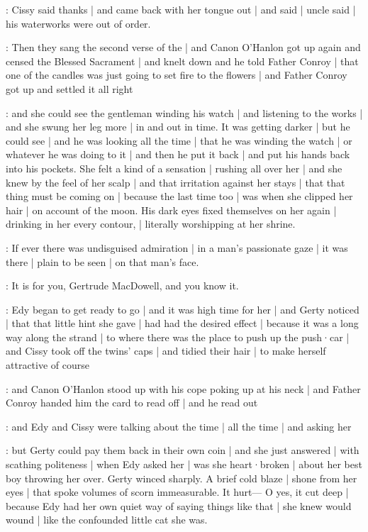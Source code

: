 :
Cissy said thanks |
and came back with her tongue out |%
and said |
uncle said |
his waterworks were out of order.

\Nrelig:
Then they sang the second verse of the  |
and Canon O'Hanlon got up again
and censed the Blessed Sacrament |
and knelt down
and he told Father Conroy |
that one of the candles
was just going to set fire to the flowers |
and Father Conroy got up
and settled it all right

\gertySex:
and she could see the gentleman
winding his watch |
and listening to the works |
and she swung her leg more |
in and out in time.
It was getting darker |
but he could see |
and he was looking all the time |
that he was winding the watch |
or whatever he was doing to it |
and then he put it back |
and put his hands back into his pockets.%
She felt a kind of a sensation |
rushing all over her |
and she knew by the feel of her scalp |
and that irritation against her stays |
that that thing must be coming on |
because the last time too |
was when she clipped her hair |
on account of the moon.
His dark eyes fixed themselves on her again |
drinking in her every contour, |
literally worshipping at her shrine.

\gertySex:
If ever there was undisguised admiration |
in a man's passionate gaze |
it was there |
plain to be seen |
on that man's face.

\gertyNovel:
It is for you,
Gertrude MacDowell,
and you know it.

\gertyReal:
Edy began to get ready to go |
and it was high time for her |
and Gerty noticed |
that that little hint she gave |
had had the desired effect |
because it was a long way
along the strand |%
to where there was the place
to push up the push·car |
and Cissy took off the twins' caps |
and tidied their hair |
to make herself attractive of course

\Nrelig:
and Canon O'Hanlon stood up
with his cope poking up at his neck |
and Father Conroy handed him the card to read off |
and he read out 

:
and Edy and Cissy were talking
about the time |
all the time |
and asking her

\gertyJudgy:
but Gerty could pay them back in their own coin |
and she just answered |
with scathing politeness |
when Edy asked her |
was she heart·broken |
about her best boy throwing her over.
Gerty winced sharply.
A brief cold blaze |
shone from her eyes |
that spoke volumes of scorn immeasurable.
It hurt—%
O yes,
it cut deep |
because Edy had her own quiet way
of saying things like that |%
she knew would wound |
like the confounded little cat
she was.

